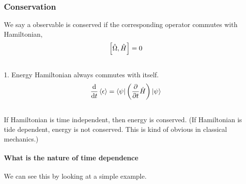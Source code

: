 \documentclass[letterpaper,10pt,english]{sphinxmanual}
\def\d{{\rm d}}
\newcommand{\bra}[1]{\left\langle #1\right|}
\newcommand{\ket}[1]{\left| #1\right\rangle}
\begin{document}
\subsubsection{Conservation}
\label{QuantumMechanics:conservation}
We say a observable is conserved if the corresponding operator commutes with Hamiltonian,
\begin{gather}
\begin{split}\left[ \hat \Omega, \hat H \right]=0\end{split}\notag\\\begin{split}\end{split}\notag
\end{gather}
1. Energy
Hamiltonian always commutes with itself.
\begin{gather}
\begin{split}\frac{\d}{\d t} \left<\epsilon \right> = \bra{\psi} \left( \frac{\partial }{\partial t} \hat H \right) \ket{\psi}\end{split}\notag\\\begin{split}\end{split}\notag
\end{gather}
If Hamiltonian is time independent, then energy is conserved. (If Hamiltonian is tide dependent, energy is not conserved. This is kind of obvious in classical mechanics.)


\paragraph{What is the nature of time dependence}
\label{QuantumMechanics:what-is-the-nature-of-time-dependence}
We can see this by looking at a simple example.
\end{document}
